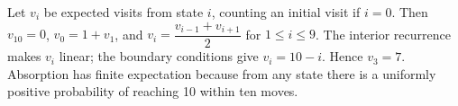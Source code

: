 Let $v_i$ be expected visits from state $i$, counting an initial visit if $i=0$. Then $v_{10}=0$, $v_0=1+v_1$, and $v_i=\dfrac{v_{i-1}+v_{i+1}}{2}$ for $1\le i\le9$. The interior recurrence makes $v_i$ linear; the boundary conditions give $v_i=10-i$. Hence $\boxed{v_3=7}$. Absorption has finite expectation because from any state there is a uniformly positive probability of reaching 10 within ten moves.

